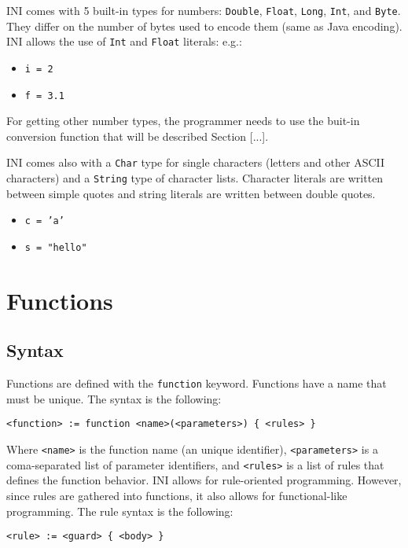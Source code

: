 \documentclass[11pt]{report}
\begin{document}
INI comes with 5 built-in types for numbers: \texttt{Double}, \texttt{Float}, \texttt{Long}, \texttt{Int}, and \texttt{Byte}. They differ on the number of bytes used to encode them (same as Java encoding). INI allows the use of \texttt{Int} and \texttt{Float} literals: e.g.:

\begin{itemize}
\item \texttt{i = 2}
\item \texttt{f = 3.1}
\end{itemize}

For getting other number types, the programmer needs to use the buit-in conversion function that will be described Section [...].

INI comes also with a \texttt{Char} type for single characters (letters and other ASCII characters) and a \texttt{String} type of character lists. Character literals are written between simple quotes and string literals are written between double quotes.

\begin{itemize}
\item \texttt{c = 'a'}
\item \texttt{s = "hello"}
\end{itemize}

\section{Functions}

\subsection{Syntax}

Functions are defined with the \texttt{function} keyword. Functions have a name that must be unique. The syntax is the following:

\begin{verbatim}
<function> := function <name>(<parameters>) { <rules> }
\end{verbatim}

Where \texttt{<name>} is the function name (an unique identifier), \texttt{<parameters>} is a coma-separated list of parameter identifiers, and \texttt{<rules>} is a list of rules that defines the function behavior. INI allows for rule-oriented programming. However, since rules are gathered into functions, it also allows for functional-like programming. The rule syntax is the following:

\begin{verbatim}
<rule> := <guard> { <body> }
\end{verbatim}
\end{document}
